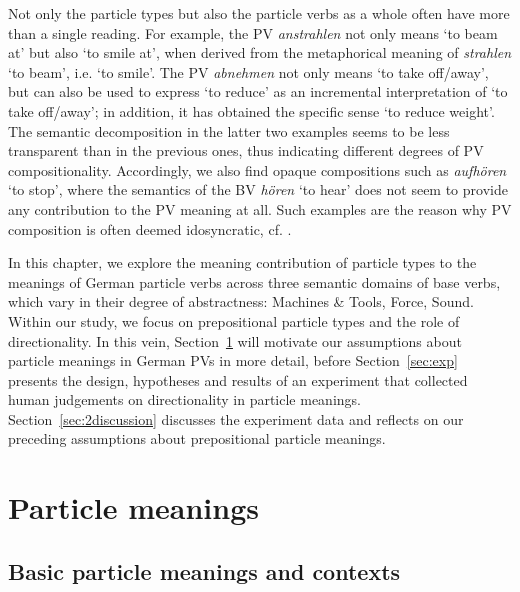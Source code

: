 \documentclass[output=paper]{langsci/langscibook}
\begin{document}
Not only the particle types but also the particle verbs as a whole
often have more than a single reading. For example, the PV
\textit{anstrahlen} not only means `to beam at' but also `to smile
at', when derived from the metaphorical meaning of \textit{strahlen}
`to beam', i.e. `to smile'. The PV \textit{abnehmen} not only means
`to take off/away', but can also be used to express `to reduce' as an
incremental interpretation of `to take off/away'; in addition, it has
obtained the specific sense `to reduce weight'. The semantic
decomposition in the latter two examples seems to be less transparent
than in the previous ones, thus indicating different degrees of PV
compositionality. Accordingly, we also find opaque compositions such
as \textit{aufhören} `to stop', where the semantics of the BV
\textit{hören} `to hear' does not seem to provide any contribution
to the PV meaning at all. Such examples are the reason why PV
composition is often deemed idosyncratic, cf. \cite{Kratzer:03}.

In this chapter, we explore the meaning contribution of particle types
to the meanings of German particle verbs across three semantic domains
of base verbs, which vary in their degree of abstractness:
Machines \& Tools, Force, Sound. Within our study, we focus
on prepositional particle types and the role of directionality. In
this vein, Section~\ref{sec:p-meaning} will motivate our assumptions
about particle meanings in German PVs in more detail, before
Section~\ref{sec:exp} presents the design, hypotheses and results of
an experiment that collected human judgements on directionality in
particle meanings. Section~\ref{sec:2discussion} discusses the
experiment data and reflects on our preceding assumptions about
prepositional particle meanings.


\section{Particle meanings}
\label{sec:p-meaning}

\subsection{Basic particle meanings and contexts}
\end{document}
